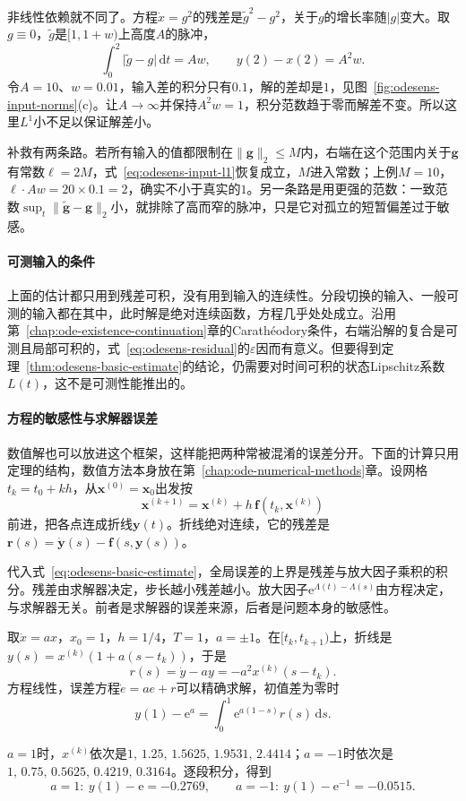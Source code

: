 非线性依赖就不同了。方程$\dot{x}=g^2$的残差是$\tilde{g}^2-g^2$，关于$g$的增长率随$\lvert g\rvert$变大。取$g\equiv0$，$\tilde{g}$是$[1,1+w)$上高度$A$的脉冲，
\[
 \int_0^2\lvert\tilde{g}-g\rvert\,\mathrm{d}t=Aw,\qquad y(2)-x(2)=A^2w.
\]
令$A=10$、$w=0.01$，输入差的积分只有$0.1$，解的差却是$1$，见图~\ref{fig:odesens-input-norms}(c)。让$A\to\infty$并保持$A^2w=1$，积分范数趋于零而解差不变。所以这里$L^1$小不足以保证解差小。

补救有两条路。若所有输入的值都限制在$\lVert\bm{g}\rVert_2\leq M$内，右端在这个范围内关于$\bm{g}$有常数$\ell=2M$，式~\eqref{eq:odesens-input-l1}恢复成立，$M$进入常数；上例$M=10$，$\ell\cdot Aw=20\times0.1=2$，确实不小于真实的$1$。另一条路是用更强的范数：一致范数$\sup_t\lVert\tilde{\bm{g}}-\bm{g}\rVert_2$小，就排除了高而窄的脉冲，只是它对孤立的短暂偏差过于敏感。

\paragraph{可测输入的条件}
上面的估计都只用到残差可积，没有用到输入的连续性。分段切换的输入、一般可测的输入都在其中，此时解是绝对连续函数，方程几乎处处成立。沿用第~\ref{chap:ode-existence-continuation}章的Carathéodory条件，右端沿解的复合是可测且局部可积的，式~\eqref{eq:odesens-residual}的$\varepsilon$因而有意义。但要得到定理~\ref{thm:odesens-basic-estimate}的结论，仍需要对时间可积的状态Lipschitz系数$L(t)$，这不是可测性能推出的。

\paragraph{方程的敏感性与求解器误差}
数值解也可以放进这个框架，这样能把两种常被混淆的误差分开。下面的计算只用定理的结构，数值方法本身放在第~\ref{chap:ode-numerical-methods}章。设网格$t_k=t_0+kh$，从$\bm{x}^{(0)}=\bm{x}_0$出发按
\[
 \bm{x}^{(k+1)}=\bm{x}^{(k)}+h\,\bm{f}(t_k,\bm{x}^{(k)})
\]
前进，把各点连成折线$\bm{y}(t)$。折线绝对连续，它的残差是$\bm{r}(s)=\dot{\bm{y}}(s)-\bm{f}(s,\bm{y}(s))$。

代入式~\eqref{eq:odesens-basic-estimate}，全局误差的上界是残差与放大因子乘积的积分。残差由求解器决定，步长越小残差越小。放大因子$\mathrm{e}^{\Lambda(t)-\Lambda(s)}$由方程决定，与求解器无关。前者是求解器的误差来源，后者是问题本身的敏感性。

\begin{example}
\label{ex:odesens-problem-solver}
取$\dot{x}=ax$，$x_0=1$，$h=1/4$，$T=1$，$a=\pm1$。在$[t_k,t_{k+1})$上，折线是$y(s)=x^{(k)}(1+a(s-t_k))$，于是
\[
 r(s)=\dot{y}-ay=-a^2x^{(k)}(s-t_k).
\]
方程线性，误差方程$\dot{e}=ae+r$可以精确求解，初值差为零时
\[
 y(1)-\mathrm{e}^{a}=\int_0^1\mathrm{e}^{a(1-s)}r(s)\,\mathrm{d}s.
\]

$a=1$时，$x^{(k)}$依次是$1,\,1.25,\,1.5625,\,1.9531,\,2.4414$；$a=-1$时依次是$1,\,0.75,\,0.5625,\,0.4219,\,0.3164$。逐段积分，得到
\[
 a=1:\ y(1)-\mathrm{e}=-0.2769,\qquad a=-1:\ y(1)-\mathrm{e}^{-1}=-0.0515.
\]
\end{example}

